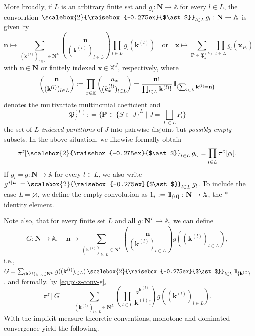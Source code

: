 \documentclass[reqno, 11pt]{amsart}
\theoremstyle{definition}
\newcommand{\X}{\mathbb X}
\newcommand{\A}{\mathbb A}
\newcommand{\be}{\begin{equation}}
\newcommand{\ee}{\end{equation}}
\newcommand{\Conv}{\mathop{\scalebox{2}{\raisebox{-0.275ex}{$\ast$}}}}
\def\1{{\mathchoice {1\mskip-4mu\mathrm l}      
{1\mskip-4mu\mathrm l}
{1\mskip-4.5mu\mathrm l} {1\mskip-5mu\mathrm l}}}
\begin{document}
More broadly, if $L$ is an arbitrary finite set and $g_l : \mathbf N \to \A$ for every $l \in L$, the convolution $\Conv_{l \in L} g_l : \mathbf N \to \A$ is given by
\[
	\mathbf n \mapsto \sum_{(\mathbf k^{(l)})_{l \in L} \in \mathbf N^L} \binom{\mathbf n}{(\mathbf k^{(l)})_{l \in L}} \prod_{l \in L} g_l(\mathbf k^{(l)}) \quad \text{or} \quad \mathbf x \mapsto \sum_{\mathbf P \in \mathfrak P_J^{(L)}} \prod_{l \in L} g_l(\mathbf x_{P_l})
\]
with $\mathbf n\in\mathbf N$ or finitely indexed $\mathbf x \in \X^J$, respectively, where
\begin{align*}
	\binom{\mathbf n}{(\mathbf k^{(l)})_{l \in L}} : = \prod_{x \in \X} \binom{n_x}{(k^{(l)}_x)_{l \in L}} = \frac{\mathbf n!}{\prod_{l \in L} \mathbf k^{(l)}!} \1_{\{\sum_{l \in L} \mathbf k^{(l)} = \mathbf n\}}
\end{align*}
denotes the multivariate multinomial coefficient and
\[
	\mathfrak P_J^{(L)} : = \{{\textstyle \mathbf P \in \{S \subset J\}^L \mid J = \bigsqcup_{L \in L} P_l}\}
\]
the set of \emph{$L$-indexed partitions} of $J$ into pairwise disjoint but \emph{possibly empty} subsets. 
In the above situation, we likewise formally obtain
\be \label{eq:pi-z-conv-g}
	\pi^z[{\textstyle \Conv_{l \in L} g_l}] = \prod_{l \in L} \pi^z[g_l].
\ee
If $g_l = g : \mathbf N \to \A$ for every $l \in L$, we also write $g^{\ast |L|} = \Conv_{l \in L} g_l$. 
To include the case $L = \varnothing$, we define the empty convolution as $1_\ast : = \1_{\{0\}} : \mathbf N \to \A$, the $\ast$-identity element.

Note also, that for every finite set $L$ and all $g : \mathbf N^L \to \A$, we can define
\be \label{eq:conv-g-generalised}
	G : \mathbf N \to \A, \quad \mathbf n \mapsto \sum_{(\mathbf k^{(l)})_{l \in L} \in \mathbf N^L} \binom{\mathbf n}{(\mathbf k^{(l)})_{l \in L}} g((\mathbf k^{(l)})_{l \in L}),
\ee
i.e., $G = \sum_{(\mathbf k^{(l)})_{l \in L} \in \mathbf N^L} g((\mathbf k^{(l)})_{l \in L}) \Conv_{l \in L} \1_{\{\mathbf k^{(l)}\}}$, and formally, by \eqref{eq:pi-z-conv-g},
\be \label{eq:pi-z-conv-g-generalised}
	\pi^z[G] = \sum_{(\mathbf k^{(l)})_{l \in L} \in \mathbf N^L} \left( \prod_{l \in L} \frac{z^{\mathbf k^{(l)}}}{\mathbf k^{(l)}!} \right) g((\mathbf k^{(l)})_{l \in L}).
\ee
With the implicit measure-theoretic conventions, monotone and dominated convergence yield the following.
\end{document}

